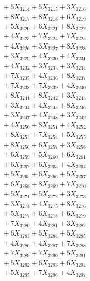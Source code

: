 \documentclass[a4paper,10pt]{article}
\begin{document}
{\begin{align}
&\;  + 5 X_{3214} + 5 X_{3215} + 3 X_{3216} \\[0.3ex]
&\;  + 8 X_{3217} + 8 X_{3218} + 6 X_{3219} \\[0.5ex]\allowbreak
&\;  + 5 X_{3220} + 6 X_{3221} + 8 X_{3222} \\[0.3ex]
&\;  + 4 X_{3223} + 7 X_{3224} + 7 X_{3225} \\[0.3ex]
&\;  + 4 X_{3226} + 3 X_{3227} + 8 X_{3228} \\[0.3ex]
&\;  + 3 X_{3229} + 4 X_{3230} + 4 X_{3231} \\[0.3ex]
&\;  + 4 X_{3232} + 3 X_{3233} + 3 X_{3234} \\[0.3ex]
&\;  + 7 X_{3235} + 4 X_{3236} + 8 X_{3237} \\[0.3ex]
&\;  + 7 X_{3238} + 7 X_{3239} + 4 X_{3240} \\[0.3ex]
&\;  + 8 X_{3241} + 8 X_{3242} + 3 X_{3243} \\[0.3ex]
&\;  + 3 X_{3244} + 4 X_{3245} + 8 X_{3246} \\[0.3ex]
&\;  + 3 X_{3247} + 4 X_{3248} + 3 X_{3249} \\[0.5ex]\allowbreak
&\;  + 4 X_{3250} + 8 X_{3251} + 4 X_{3252} \\[0.3ex]
&\;  + 8 X_{3253} + 7 X_{3254} + 5 X_{3255} \\[0.3ex]
&\;  + 8 X_{3256} + 6 X_{3257} + 3 X_{3258} \\[0.3ex]
&\;  + 6 X_{3259} + 5 X_{3260} + 6 X_{3261} \\[0.3ex]
&\;  + 6 X_{3262} + 6 X_{3263} + 4 X_{3264} \\[0.3ex]
&\;  + 5 X_{3265} + 6 X_{3266} + 5 X_{3267} \\[0.3ex]
&\;  + 6 X_{3268} + 8 X_{3269} + 7 X_{3270} \\[0.3ex]
&\;  + 5 X_{3271} + 5 X_{3272} + 3 X_{3273} \\[0.3ex]
&\;  + 3 X_{3274} + 4 X_{3275} + 8 X_{3276} \\[0.3ex]
&\;  + 5 X_{3277} + 6 X_{3278} + 6 X_{3279} \\[0.5ex]\allowbreak
&\;  + 7 X_{3280} + 4 X_{3281} + 3 X_{3282} \\[0.3ex]
&\;  + 6 X_{3283} + 5 X_{3284} + 5 X_{3285} \\[0.3ex]
&\;  + 4 X_{3286} + 4 X_{3287} + 7 X_{3288} \\[0.3ex]
&\;  + 7 X_{3289} + 7 X_{3290} + 5 X_{3291} \\[0.3ex]
&\;  + 5 X_{3292} + 6 X_{3293} + 6 X_{3294} \\[0.3ex]
&\;  + 5 X_{3295} + 7 X_{3296} + 4 X_{3297} \\[0.3ex]

\end{align}}
\end{document}
